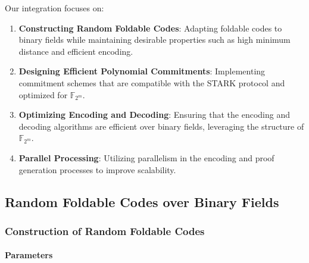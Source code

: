 \documentclass{article}
\theoremstyle{plain}
\theoremstyle{definition}
\theoremstyle{remark}
\theoremstyle{problem}
\begin{document}
Our integration focuses on:

\begin{enumerate}
    \item \textbf{Constructing Random Foldable Codes}: Adapting foldable codes to binary fields while maintaining desirable properties such as high minimum distance and efficient encoding.
    \item \textbf{Designing Efficient Polynomial Commitments}: Implementing commitment schemes that are compatible with the STARK protocol and optimized for $\mathbb{F}_{2^m}$.
    \item \textbf{Optimizing Encoding and Decoding}: Ensuring that the encoding and decoding algorithms are efficient over binary fields, leveraging the structure of $\mathbb{F}_{2^m}$.
    \item \textbf{Parallel Processing}: Utilizing parallelism in the encoding and proof generation processes to improve scalability.
\end{enumerate}

\subsection{Random Foldable Codes over Binary Fields}

\subsubsection{Construction of Random Foldable Codes}

\paragraph{Parameters}
\end{document}
